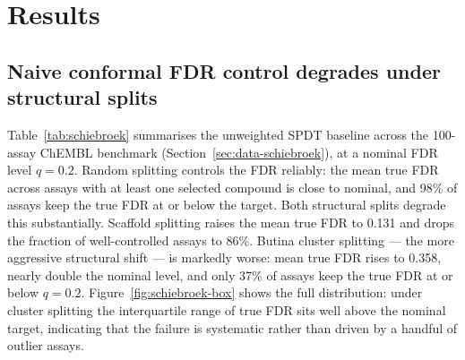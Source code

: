 \documentclass[11pt]{article}
\begin{document}
\section{Results}
\label{sec:results}

\subsection{Naive conformal FDR control degrades under structural splits}
\label{sec:results-schiebroek}

Table~\ref{tab:schiebroek} summarises the unweighted SPDT baseline across the
100-assay ChEMBL benchmark (Section~\ref{sec:data-schiebroek}), at a nominal
FDR level $q=0.2$. Random splitting controls the FDR reliably: the mean true
FDR across assays with at least one selected compound is close to nominal, and
98\% of assays keep the true FDR at or below the target. Both structural
splits degrade this substantially. Scaffold splitting raises the mean true
FDR to 0.131 and drops the fraction of well-controlled assays to 86\%.
Butina cluster splitting --- the more aggressive structural shift --- is
markedly worse: mean true FDR rises to 0.358, nearly double the nominal
level, and only 37\% of assays keep the true FDR at or below $q=0.2$.
Figure~\ref{fig:schiebroek-box} shows the full distribution: under cluster
splitting the interquartile range of true FDR sits well above the nominal
target, indicating that the failure is systematic rather than driven by a
handful of outlier assays.

\begin{table}[t]
\centering
\caption{Unweighted SPDT, 100 ChEMBL bioactivity assays
(\texttt{results/schiebroek\_results\_*.csv}), nominal FDR $q=0.2$. ``Assays
w/ selection'' excludes assays where no compound was selected at $q=0.2$ (no
FDR is defined in that case). Mean true FDR and the fraction of well-controlled
assays are computed over that subset.}
\label{tab:schiebroek}
\end{table}
\end{document}
